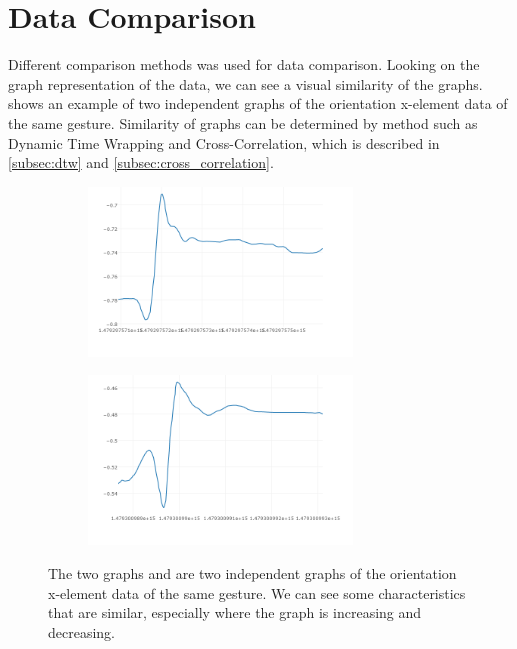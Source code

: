 \section{Data Comparison}
\label{sec:data_comparison}
Different comparison methods was used for data comparison. Looking on the graph representation of the data, we can see a visual similarity of the graphs.  shows an example of two independent graphs of the orientation x-element data of the same gesture. Similarity of graphs can be determined by method such as Dynamic Time Wrapping and Cross-Correlation, which is described in \cref{subsec:dtw} and \ref{subsec:cross_correlation}. 

\begin{figure}[!ht]
    \centering
    \begin{subfigure}{.5\textwidth}
        \centering
        \includegraphics[height=4.5cm]{content/05-Methodology/images/eat-ori-x1.png}
        \caption{}
        \label{fig:eat_ori_x1}
    \end{subfigure}%
    \begin{subfigure}{.5\textwidth}
        \centering
        \includegraphics[height=4.5cm]{content/05-Methodology/images/eat-ori-x2.png}
        \caption{}
        \label{fig:eat_ori_x2}
    \end{subfigure}
    \caption[Visual similarity of two IMU-graphs]{The two graphs  and  are two independent graphs of the orientation x-element data of the same gesture. We can see some characteristics that are similar, especially where the graph is increasing and decreasing.}
    \label{fig:visual_IMU_similarity_example}
\end{figure}


